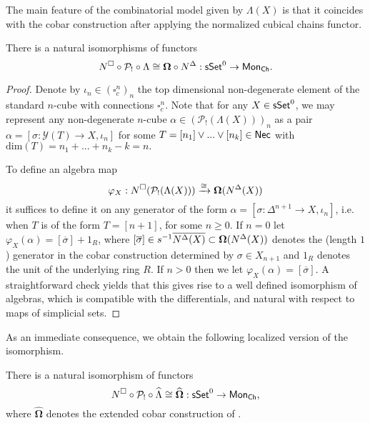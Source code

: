 The main feature of the combinatorial model given by $\Lambda(X)$ is that it coincides with the cobar construction after applying the normalized cubical chains functor. 

\begin{proposition}
There is a natural isomorphisms of functors 
$$N^{\square} \circ \mathcal{P}_! \circ \Lambda \cong \mathbf{\Omega} \circ N^{\Delta}: \mathsf{sSet}^0 \to \mathsf{Mon}_{\mathsf{Ch}}.$$
\end{proposition}

\begin{proof} 
Denote by $\iota_n \in (\square^n_c)_n$ the top dimensional non-degenerate element of the standard $n$-cube with connections $\square^n_c$. Note that for any $X \in \mathsf{sSet}^0$, we may represent any non-degenerate $n$-cube $\alpha \in (\mathcal{P}_!(\Lambda(X)))_n$ as a pair $\alpha=[\sigma: \mathcal{Y}(T) \to X, \iota_n]$ for some $T=[n_1] \vee ... \vee [n_k] \in \mathsf{Nec}$ with $\text{dim}(T)=n_1+ ...+n_k-k=n.$

To define an algebra map
$$\varphi_X: N^{\square}(\mathcal{P}_!(\Lambda(X))) \xrightarrow{\cong} \mathbf{\Omega}(N^{\Delta}(X))$$
it suffices to define it on any generator of the form $\alpha=[\sigma \colon \Delta^{n+1} \to X, \iota_{n}]$, i.e. when $T$ is of the form $T=[n+1]$, for some $n\geq0$. If $n=0$ let $\varphi_X(\alpha)= [\overline{\sigma}]+ 1_R$, where $[\overline{\sigma}] \in s^{-1} \overline{ N^{\Delta}(X)} \subset \mathbf{\Omega}(N^{\Delta}(X))$ denotes the (length $1$) generator in the cobar construction determined by $\sigma \in X_{n+1}$ and $1_R$ denotes the unit of the underlying ring $R$. If $n>0$ then we let $\varphi_X(\alpha)=[\overline{\sigma}]$. A straightforward check yields that this gives rise to a well defined isomorphism of algebras, which is compatible with the differentials, and natural with respect to maps of simplicial sets.  
\end{proof}
As an immediate consequence, we obtain the following localized version of the isomorphism.
\begin{corollary}
There is a natural isomorphism of functors
$$N^{\square} \circ \mathcal{P}_! \circ \widehat{\Lambda} \cong \widehat{\mathbf{\Omega}} :\mathsf{sSet}^0 \to \mathsf{Mon}_{\mathsf{Ch}},$$ where $\widehat{\mathbf{\Omega}}$ denotes the extended cobar construction of \cite{Hess and Tonk}. 
\end{corollary}


